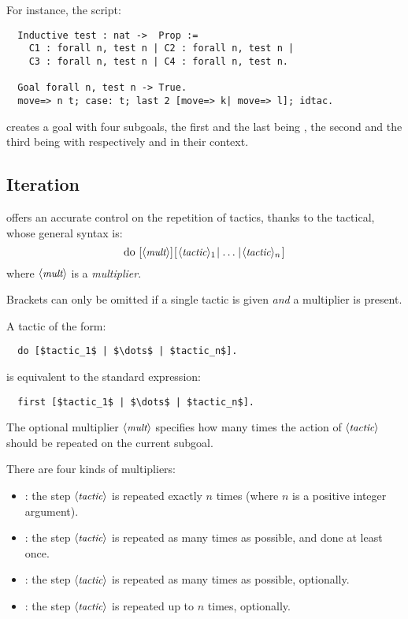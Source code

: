 For instance, the script:
\begin{lstlisting}
  Inductive test : nat ->  Prop :=
    C1 : forall n, test n | C2 : forall n, test n |
    C3 : forall n, test n | C4 : forall n, test n.

  Goal forall n, test n -> True.
  move=> n t; case: t; last 2 [move=> k| move=> l]; idtac.
\end{lstlisting}

creates a goal with four subgoals, the first and the last being
, the second and the third being  with
respectively  and  in their context.

\subsection{Iteration}\label{ssec:iter}

\ssr{} offers an accurate control on the repetition of
tactics, thanks to the  tactical, whose general syntax is:
  $$\C{do}\ [\N{mult}]\C{[}\N{tactic}_1 \C{|} \dots \C{|} \N{tactic}_n\C{]}$$
where $\langle\mbox{\itshape\rmfamily\small mult}\rangle$ is a \emph{multiplier}.

Brackets can only be omitted if a single tactic is given \emph{and} a
multiplier is present.

A tactic of the form:
\begin{lstlisting}
  do [$tactic_1$ | $\dots$ | $tactic_n$].
\end{lstlisting}
is equivalent to the standard \Ltac{} expression:
\begin{lstlisting}
  first [$tactic_1$ | $\dots$ | $tactic_n$].
\end{lstlisting}

The optional multiplier $\langle\mbox{\itshape\rmfamily\small mult}\rangle$ specifies how many times
the action of $\langle\mbox{\itshape\rmfamily\small tactic}\rangle$ should be repeated on the current subgoal.

There are four kinds of multipliers:
  \begin{itemize}
  \item {}: the step $\langle\mbox{\itshape\rmfamily\small tactic}\rangle$ is repeated exactly $n$ times
    (where $n$ is a positive integer argument).
  \item \C{!}: the step $\langle\mbox{\itshape\rmfamily\small tactic}\rangle$ is repeated as many times as possible,
    and done at least once.
  \item {}: the step $\langle\mbox{\itshape\rmfamily\small tactic}\rangle$ is repeated as many times as possible,
    optionally.
  \item {}: the step $\langle\mbox{\itshape\rmfamily\small tactic}\rangle$ is repeated up to $n$ times,
    optionally.
  \end{itemize}

